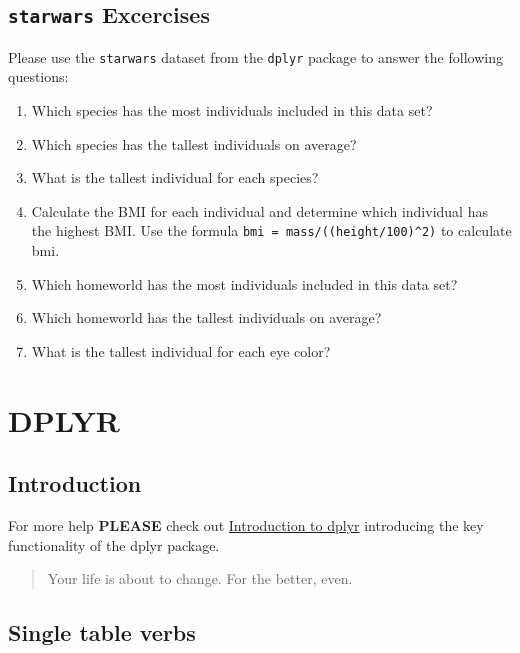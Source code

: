 \documentclass[
]{book}
\providecommand{\tightlist}{%
  \setlength{\itemsep}{0pt}\setlength{\parskip}{0pt}}
\begin{document}
\hypertarget{starwars-excercises-1}{%
\section{\texorpdfstring{\texttt{starwars} Excercises}{starwars Excercises}}\label{starwars-excercises-1}}

Please use the \texttt{starwars} dataset from the \texttt{dplyr} package to answer the following questions:

\begin{enumerate}
\def\labelenumi{\arabic{enumi}.}
\tightlist
\item
  Which species has the most individuals included in this data set?
\item
  Which species has the tallest individuals on average?
\item
  What is the tallest individual for each species?
\item
  Calculate the BMI for each individual and determine which individual has the highest BMI. Use the formula \texttt{bmi\ =\ mass/((height/100)\^{}2)} to calculate bmi.
\item
  Which homeworld has the most individuals included in this data set?
\item
  Which homeworld has the tallest individuals on average?
\item
  What is the tallest individual for each eye color?
\end{enumerate}

\hypertarget{dplyr}{%
\chapter{DPLYR}\label{dplyr}}

\hypertarget{introduction-4}{%
\section{Introduction}\label{introduction-4}}

For more help \textbf{PLEASE} check out \href{https://dplyr.tidyverse.org/articles/dplyr.html}{Introduction to dplyr} introducing the key functionality of the dplyr package.

\begin{quote}
Your life is about to change. For the better, even.
\end{quote}

\hypertarget{single-table-verbs-1}{%
\section{Single table verbs}\label{single-table-verbs-1}}
\end{document}
